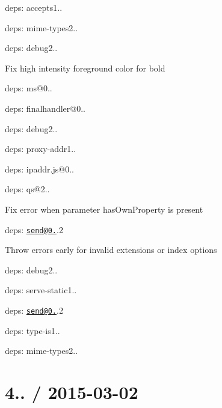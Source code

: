 
\begin{DoxyItemize}
\item deps\+: accepts1..
\begin{DoxyItemize}
\item deps\+: mime-\/types2..
\end{DoxyItemize}
\item deps\+: debug2..
\begin{DoxyItemize}
\item Fix high intensity foreground color for bold
\item deps\+: ms@0..
\end{DoxyItemize}
\item deps\+: finalhandler@0..
\begin{DoxyItemize}
\item deps\+: debug2..
\end{DoxyItemize}
\item deps\+: proxy-\/addr1..
\begin{DoxyItemize}
\item deps\+: ipaddr.\+js@0..
\end{DoxyItemize}
\item deps\+: qs@2..
\begin{DoxyItemize}
\item Fix error when parameter {\ttfamily has\+Own\+Property} is present
\end{DoxyItemize}
\item deps\+: \href{mailto:send@0.12}{\tt send@0.}.2
\begin{DoxyItemize}
\item Throw errors early for invalid {\ttfamily extensions} or {\ttfamily index} options
\item deps\+: debug2..
\end{DoxyItemize}
\item deps\+: serve-\/static1..
\begin{DoxyItemize}
\item deps\+: \href{mailto:send@0.12}{\tt send@0.}.2
\end{DoxyItemize}
\item deps\+: type-\/is1..
\begin{DoxyItemize}
\item deps\+: mime-\/types2..
\end{DoxyItemize}
\end{DoxyItemize}

\section*{4.. / 2015-\/03-\/02 }


